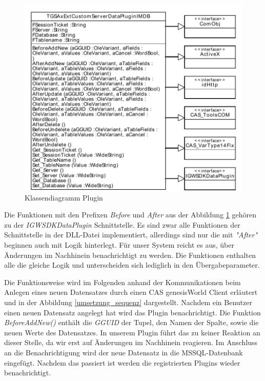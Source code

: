 \begin{figure}[htbp]
\centering
\includegraphics[scale=0.7]{pics/plugin_klassendiagramm.pdf}
\caption{Klassendiagramm Plugin}
\label{ergebniss_plugin_klassendiagramm}
\end{figure}

Die Funktionen mit den Prefixen \textit{Before} und \textit{After} aus der Abbildung \ref{ergebniss_plugin_klassendiagramm} gehören zu der \textit{IGWSDKDataPlugin} Schnittstelle. Es sind zwar alle Funktionen der Schnittstelle in der DLL-Datei implementiert, allerdings sind nur die mit \textit{"After"} beginnen auch mit Logik hinterlegt. Für unser System reicht es aus, über Änderungen im Nachhinein benachrichtigt zu werden. Die Funktionen enthalten alle die gleiche Logik und unterscheiden sich lediglich in den Übergabeparameter.

Die Funktionsweise wird im Folgenden anhand der Kommunikationen beim Anlegen eines neuen Datensatzes durch einen CAS genesisWorld Client erläutert und in der Abbildung \ref{umsetzung_sequenz} dargestellt. Nachdem ein Benutzer einen neuen Datensatz angelegt hat wird das Plugin benachrichtigt. Die Funktion \textit{BeforeAddNew()} enthält die \textit{GGUID} der Tupel, den Namen der Spalte, sowie die neuen Werte des Datensatzes. In unserem Plugin führt das zu keiner Reaktion an dieser Stelle, da wir erst auf Änderungen im Nachhinein reagieren. Im Anschluss an die Benachrichtigung wird der neue Datensatz in die MSSQL-Datenbank eingefügt. Nachdem das passiert ist werden die registrierten Plugins wieder benachrichtigt.

